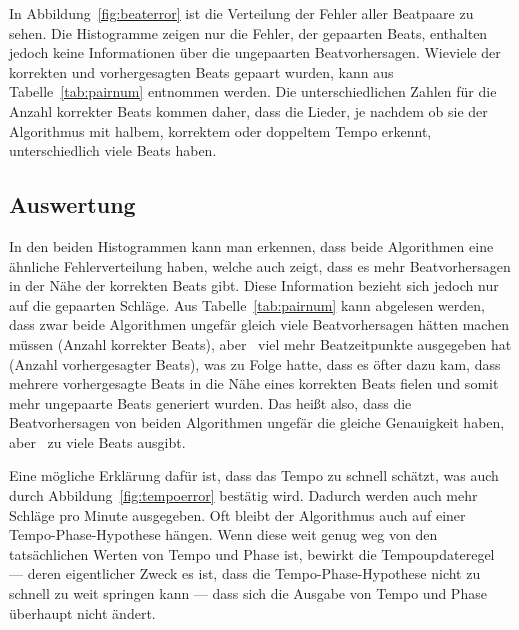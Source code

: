 {{		In Abbildung~\ref{fig:beaterror} ist die Verteilung der Fehler aller Beatpaare zu sehen.
		Die Histogramme zeigen nur die Fehler,
			der gepaarten Beats,
			enthalten jedoch keine Informationen über die ungepaarten Beatvorhersagen.
		Wieviele der korrekten und vorhergesagten Beats gepaart wurden,
			kann aus Tabelle~\ref{tab:pairnum} entnommen werden.
		Die unterschiedlichen Zahlen für die Anzahl korrekter Beats kommen daher,
			dass die Lieder,
			je nachdem ob sie der Algorithmus mit halbem, korrektem oder doppeltem Tempo erkennt,
			unterschiedlich viele Beats haben.
	}

	\subsection{Auswertung}
	{
		In den beiden Histogrammen kann man erkennen,
			dass beide Algorithmen eine ähnliche Fehlerverteilung haben,
			welche auch zeigt,
			dass es mehr Beatvorhersagen in der Nähe der korrekten Beats gibt.
		Diese Information bezieht sich jedoch nur auf die gepaarten Schläge.
		Aus Tabelle~\ref{tab:pairnum} kann abgelesen werden,
			dass zwar beide Algorithmen ungefär gleich viele Beatvorhersagen hätten machen müssen (Anzahl korrekter Beats),
			aber~\cite{2011_PlRoSt} viel mehr Beatzeitpunkte ausgegeben hat (Anzahl vorhergesagter Beats),
			was zu Folge hatte,
			dass es öfter dazu kam,
			dass mehrere vorhergesagte Beats in die Nähe eines korrekten Beats fielen
			und somit mehr ungepaarte Beats generiert wurden.
		Das heißt also,
			dass die Beatvorhersagen von beiden Algorithmen ungefär die gleiche Genauigkeit haben,
			aber~\cite{2011_PlRoSt} zu viele Beats ausgibt.

		Eine mögliche Erklärung dafür ist,
			dass \cite{2011_PlRoSt} das Tempo zu schnell schätzt,
			was auch durch Abbildung~\ref{fig:tempoerror} bestätig wird.
		Dadurch werden auch mehr Schläge pro Minute ausgegeben.
		Oft bleibt der Algorithmus auch auf einer Tempo-Phase-Hypothese hängen.
		Wenn diese weit genug weg von den tatsächlichen Werten von Tempo und Phase ist,
			bewirkt die Tempoupdateregel ---
			deren eigentlicher Zweck es ist,
			dass die Tempo-Phase-Hypothese nicht zu schnell zu weit springen kann ---
			dass sich die Ausgabe von Tempo und Phase überhaupt nicht ändert.
	}
}

